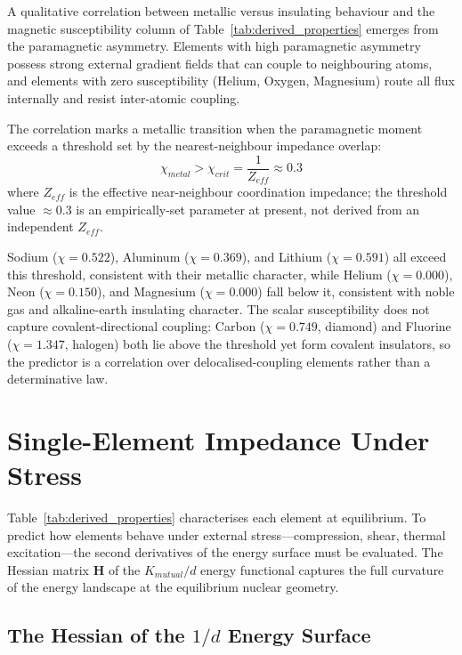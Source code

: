 A qualitative correlation between metallic versus insulating behaviour and the magnetic susceptibility column of Table~\ref{tab:derived_properties} emerges from the paramagnetic asymmetry. Elements with high paramagnetic asymmetry possess strong external gradient fields that can couple to neighbouring atoms, and elements with zero susceptibility (Helium, Oxygen, Magnesium) route all flux internally and resist inter-atomic coupling.

The correlation marks a metallic transition when the paramagnetic moment exceeds a threshold set by the nearest-neighbour impedance overlap:
\begin{equation}
    \chi_{metal} > \chi_{crit} = \frac{1}{Z_{eff}} \approx 0.3
\end{equation}
where $Z_{eff}$ is the effective near-neighbour coordination impedance; the threshold value $\approx 0.3$ is an empirically-set parameter at present, not derived from an independent $Z_{eff}$.

Sodium ($\chi = 0.522$), Aluminum ($\chi = 0.369$), and Lithium ($\chi = 0.591$) all exceed this threshold, consistent with their metallic character, while Helium ($\chi = 0.000$), Neon ($\chi = 0.150$), and Magnesium ($\chi = 0.000$) fall below it, consistent with noble gas and alkaline-earth insulating character. The scalar susceptibility does not capture covalent-directional coupling: Carbon ($\chi = 0.749$, diamond) and Fluorine ($\chi = 1.347$, halogen) both lie above the threshold yet form covalent insulators, so the predictor is a correlation over delocalised-coupling elements rather than a determinative law.

\section{Single-Element Impedance Under Stress}
\label{sec:element_impedance}

Table~\ref{tab:derived_properties} characterises each element at equilibrium. To predict how elements behave under external stress---compression, shear, thermal excitation---the second derivatives of the energy surface must be evaluated. The Hessian matrix $\mathbf{H}$ of the $K_{mutual}/d$ energy functional captures the full curvature of the energy landscape at the equilibrium nuclear geometry.

\subsection{The Hessian of the $1/d$ Energy Surface}

